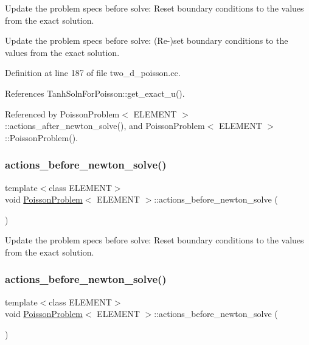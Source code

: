 Update the problem specs before solve\+: Reset boundary conditions to the values from the exact solution. 

Update the problem specs before solve\+: (Re-\/)set boundary conditions to the values from the exact solution. 

Definition at line 187 of file two\+\_\+d\+\_\+poisson.\+cc.



References Tanh\+Soln\+For\+Poisson\+::get\+\_\+exact\+\_\+u().



Referenced by Poisson\+Problem$<$ E\+L\+E\+M\+E\+N\+T $>$\+::actions\+\_\+after\+\_\+newton\+\_\+solve(), and Poisson\+Problem$<$ E\+L\+E\+M\+E\+N\+T $>$\+::\+Poisson\+Problem().

\mbox{\label{classPoissonProblem_a398608a5ff73b74c5a387b3f794c58df}} 
\subsubsection{\texorpdfstring{actions\+\_\+before\+\_\+newton\+\_\+solve()}{actions\_before\_newton\_solve()}\hspace{0.1cm}{\footnotesize\ttfamily [2/3]}}
{\footnotesize\ttfamily template$<$class E\+L\+E\+M\+E\+NT$>$ \\
void \hyperlink{classPoissonProblem}{Poisson\+Problem}$<$ E\+L\+E\+M\+E\+NT $>$\+::actions\+\_\+before\+\_\+newton\+\_\+solve (\begin{DoxyParamCaption}{ }\end{DoxyParamCaption})}



Update the problem specs before solve\+: Reset boundary conditions to the values from the exact solution. 

\mbox{\label{classPoissonProblem_a398608a5ff73b74c5a387b3f794c58df}} 
\subsubsection{\texorpdfstring{actions\+\_\+before\+\_\+newton\+\_\+solve()}{actions\_before\_newton\_solve()}\hspace{0.1cm}{\footnotesize\ttfamily [3/3]}}
{\footnotesize\ttfamily template$<$class E\+L\+E\+M\+E\+NT$>$ \\
void \hyperlink{classPoissonProblem}{Poisson\+Problem}$<$ E\+L\+E\+M\+E\+NT $>$\+::actions\+\_\+before\+\_\+newton\+\_\+solve (\begin{DoxyParamCaption}{ }\end{DoxyParamCaption})}



